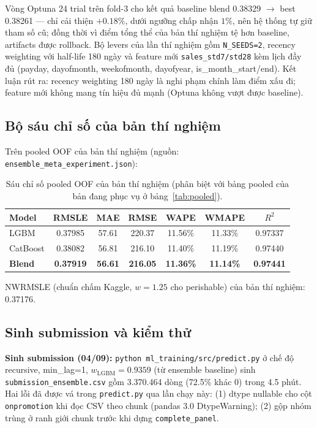 \documentclass[12pt,a4paper]{report}
\begin{document}
Vòng Optuna 24 trial trên fold-3 cho kết quả baseline blend 0.38329 $\rightarrow$ best
0.38261 --- chỉ cải thiện $+0.18\%$, dưới ngưỡng chấp nhận $1\%$, nên hệ thống tự giữ
tham số cũ; đồng thời vì điểm tổng thể của bản thí nghiệm tệ hơn baseline, artifacts
được rollback. Bộ levers của lần thí nghiệm gồm \texttt{N\_SEEDS=2}, recency weighting
với half-life 180 ngày và feature mới \texttt{sales\_std7/std28} kèm lịch đầy đủ
(payday, dayofmonth, weekofmonth, dayofyear, is\_month\_start/end). Kết luận rút ra:
recency weighting 180 ngày là nghi phạm chính làm điểm xấu đi; feature mới không mang
tín hiệu đủ mạnh (Optuna không vượt được baseline).

\subsection{Bộ sáu chỉ số của bản thí nghiệm}

Trên pooled OOF của bản thí nghiệm (nguồn: \texttt{ensemble\_meta\_experiment.json}):

\begin{table}[H]
\centering
\small
\begin{tabular}{@{}lcccccc@{}}
\toprule
\textbf{Model} & \textbf{RMSLE} & \textbf{MAE} & \textbf{RMSE} & \textbf{WAPE} & \textbf{WMAPE} & $R^2$ \\
\midrule
LGBM & 0.37985 & 57.61 & 220.37 & 11.56\% & 11.33\% & 0.97337 \\
CatBoost & 0.38082 & 56.81 & 216.10 & 11.40\% & 11.19\% & 0.97440 \\
\textbf{Blend} & \textbf{0.37919} & \textbf{56.61} & \textbf{216.05} & \textbf{11.36\%} & \textbf{11.14\%} & \textbf{0.97441} \\
\bottomrule
\end{tabular}
\caption{Sáu chỉ số pooled OOF của bản thí nghiệm (phân biệt với bảng pooled của bản đang phục vụ ở bảng~\ref{tab:pooled}).}
\label{tab:experimentmetrics}
\end{table}

NWRMSLE (chuẩn chấm Kaggle, $w = 1.25$ cho perishable) của bản thí nghiệm: 0.37176.

\subsection{Sinh submission và kiểm thử}

\textbf{Sinh submission (04/09):} \texttt{python ml\_training/\allowbreak src/\allowbreak predict.py} ở chế độ
recursive, min\_lag=1, $w_{\mathrm{LGBM}} = 0.9359$ (từ ensemble baseline) sinh
\texttt{submission\_ensemble.csv} gồm 3.370.464 dòng (72.5\% khác 0) trong 4.5 phút.
Hai lỗi đã được vá trong \texttt{predict.py} qua lần chạy này: (1) dtype nullable cho
cột \texttt{onpromotion} khi đọc CSV theo chunk (pandas 3.0 DtypeWarning); (2) gộp nhóm
trùng ở ranh giới chunk trước khi dựng \texttt{complete\_panel}.
\end{document}
